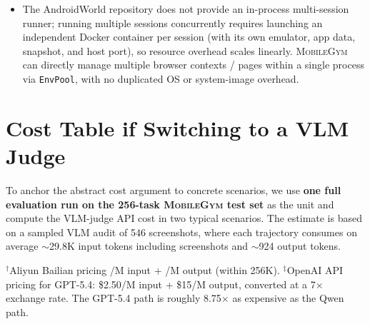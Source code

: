 \documentclass{llmxive}
\providecommand{\sys}{\textsc{MobileGym}}
\begin{document}
\begin{itemize}
  \item The AndroidWorld repository does not provide an in-process multi-session runner; running multiple sessions concurrently requires launching an independent Docker container per session (with its own emulator, app data, snapshot, and host port), so resource overhead scales linearly. \sys{} can directly manage multiple browser contexts / pages within a single process via \texttt{EnvPool}, with no duplicated OS or system-image overhead.
\end{itemize}


\section{Cost Table if Switching to a VLM Judge}\label{app:cost}

To anchor the abstract cost argument to concrete scenarios, we use \textbf{one full evaluation run on the 256-task \sys{} test set} as the unit and compute the VLM-judge API cost in two typical scenarios. The estimate is based on a sampled VLM audit of 546 screenshots, where each trajectory consumes on average $\sim$29.8K input tokens including screenshots and $\sim$924 output tokens.

\begin{table}[!htbp]
  \centering\small
  \setlength{\tabcolsep}{3pt}
  \caption{Per-run cost comparison if a VLM judge were used}
  \label{tab:cost-actual}
\end{table}

$^\dagger$Aliyun Bailian pricing /M input + /M output (within 256K). $^\ddagger$OpenAI API pricing for GPT-5.4: \$2.50/M input + \$15/M output, converted at a 7$\times$ exchange rate. The GPT-5.4 path is roughly 8.75$\times$ as expensive as the Qwen path.
\end{document}
